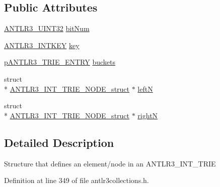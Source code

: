 \subsection*{Public Attributes}
\begin{DoxyCompactItemize}
\item 
\hyperlink{antlr3defs_8h_ac41f744abd0fd25144b9eb9d11b1dfd1}{A\-N\-T\-L\-R3\-\_\-\-U\-I\-N\-T32} \hyperlink{struct_a_n_t_l_r3___i_n_t___t_r_i_e___n_o_d_e__struct_ac512fa1b8d8c3508dbdf60904c7d7bbd}{bit\-Num}
\item 
\hyperlink{antlr3defs_8h_aa5533fd558adc28dc2af0039f52324a8}{A\-N\-T\-L\-R3\-\_\-\-I\-N\-T\-K\-E\-Y} \hyperlink{struct_a_n_t_l_r3___i_n_t___t_r_i_e___n_o_d_e__struct_ae2e3dd0ed90f313ba1fb40013272c735}{key}
\item 
\hyperlink{antlr3collections_8h_a6e433c54e4d176e8656a00707a35a384}{p\-A\-N\-T\-L\-R3\-\_\-\-T\-R\-I\-E\-\_\-\-E\-N\-T\-R\-Y} \hyperlink{struct_a_n_t_l_r3___i_n_t___t_r_i_e___n_o_d_e__struct_a50dfd26bdc90f07b85db6a58069842f6}{buckets}
\item 
struct \\*
\hyperlink{struct_a_n_t_l_r3___i_n_t___t_r_i_e___n_o_d_e__struct}{A\-N\-T\-L\-R3\-\_\-\-I\-N\-T\-\_\-\-T\-R\-I\-E\-\_\-\-N\-O\-D\-E\-\_\-struct} $\ast$ \hyperlink{struct_a_n_t_l_r3___i_n_t___t_r_i_e___n_o_d_e__struct_aaf8b77d546946b2a5879e1a8d330955b}{left\-N}
\item 
struct \\*
\hyperlink{struct_a_n_t_l_r3___i_n_t___t_r_i_e___n_o_d_e__struct}{A\-N\-T\-L\-R3\-\_\-\-I\-N\-T\-\_\-\-T\-R\-I\-E\-\_\-\-N\-O\-D\-E\-\_\-struct} $\ast$ \hyperlink{struct_a_n_t_l_r3___i_n_t___t_r_i_e___n_o_d_e__struct_a1635fd0ed92e76ddd0a9983b34a445f5}{right\-N}
\end{DoxyCompactItemize}


\subsection{Detailed Description}
Structure that defines an element/node in an A\-N\-T\-L\-R3\-\_\-\-I\-N\-T\-\_\-\-T\-R\-I\-E 

Definition at line 349 of file antlr3collections.\-h.



